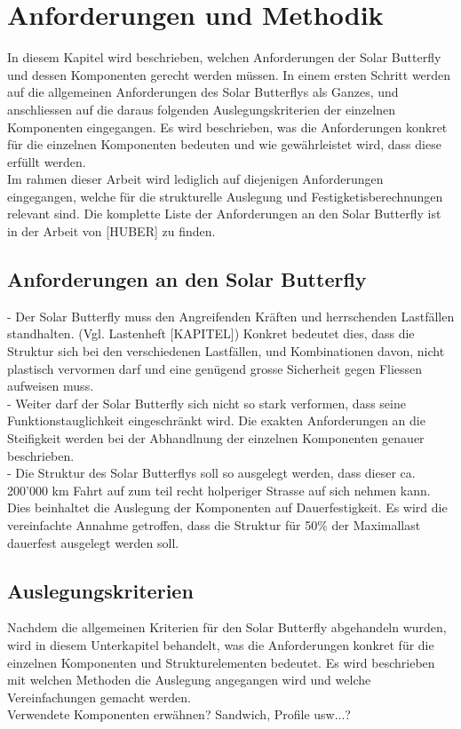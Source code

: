\section{Anforderungen und Methodik}
In diesem Kapitel wird beschrieben, welchen Anforderungen der Solar Butterfly und dessen Komponenten gerecht werden müssen. In einem ersten Schritt werden auf die allgemeinen Anforderungen des Solar Butterflys als Ganzes, und anschliessen auf die daraus folgenden Auslegungskriterien der einzelnen Komponenten eingegangen. Es wird beschrieben, was die Anforderungen konkret für die einzelnen Komponenten bedeuten und wie gewährleistet wird, dass diese erfüllt werden.\\
Im rahmen dieser Arbeit wird lediglich auf diejenigen Anforderungen eingegangen, welche für die strukturelle Auslegung und Festigketisberechnungen relevant sind. Die komplette Liste der Anforderungen an den Solar Butterfly ist in der Arbeit von [HUBER] zu finden.

\subsection{Anforderungen an den Solar Butterfly}
- Der Solar Butterfly muss den Angreifenden Kräften und herrschenden Lastfällen standhalten. (Vgl. Lastenheft [KAPITEL]) Konkret bedeutet dies, dass die Struktur sich bei den verschiedenen Lastfällen, und Kombinationen davon, nicht plastisch vervormen darf und eine genügend grosse Sicherheit gegen Fliessen aufweisen muss.\\
- Weiter darf der Solar Butterfly sich nicht so stark verformen, dass seine Funktionstauglichkeit eingeschränkt wird. Die exakten Anforderungen an die Steifigkeit werden bei der Abhandlnung der einzelnen Komponenten genauer beschrieben.\\
- Die Struktur des Solar Butterflys soll so ausgelegt werden, dass dieser ca. 200'000 km Fahrt auf zum teil recht holperiger Strasse auf sich nehmen kann. Dies beinhaltet die Auslegung der Komponenten auf Dauerfestigkeit. Es wird die vereinfachte Annahme getroffen, dass die Struktur für 50\% der Maximallast dauerfest ausgelegt werden soll.

\subsection{Auslegungskriterien}
Nachdem die allgemeinen Kriterien für den Solar Butterfly abgehandeln wurden, wird in diesem Unterkapitel behandelt, was die Anforderungen konkret für die einzelnen Komponenten und Strukturelementen bedeutet. Es wird beschrieben mit welchen Methoden die Auslegung angegangen wird und welche Vereinfachungen gemacht werden.\\
Verwendete Komponenten erwähnen? Sandwich, Profile usw...?

